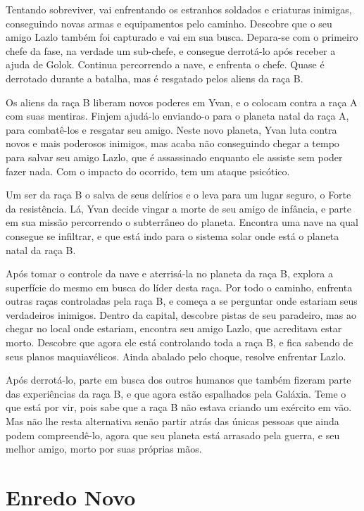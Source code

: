 \documentclass[12pt, a4paper]{article}
\begin{document}
    Tentando sobreviver, vai enfrentando os estranhos soldados e criaturas inimigas,
    conseguindo novas armas e equipamentos pelo caminho. Descobre que o seu amigo 
    Lazlo também foi capturado e vai em sua busca. Depara-se com o primeiro chefe
    da fase, na verdade um sub-chefe, e consegue derrotá-lo após receber a ajuda
    de Golok. Continua percorrendo a nave, e enfrenta o chefe. Quase é derrotado
    durante a batalha, mas é resgatado pelos aliens da raça B.

    Os aliens da raça B liberam novos poderes em Yvan, e o colocam contra a raça A
    com suas mentiras. Finjem ajudá-lo enviando-o para o planeta natal da raça A,
    para combatê-los e resgatar seu amigo. Neste novo planeta, Yvan luta contra
    novos e mais poderosos inimigos, mas acaba não conseguindo chegar a tempo para
    salvar seu amigo Lazlo, que é assassinado enquanto ele assiste sem poder fazer
    nada. Com o impacto do ocorrido, tem um ataque psicótico.

    Um ser da raça B o salva de seus delírios e o leva para um lugar seguro, o Forte
    da resistência. Lá, Yvan decide vingar a morte de seu amigo de infância, e
    parte em sua missão percorrendo o subterrâneo do planeta. Encontra uma nave na
    qual consegue se infiltrar, e que está indo para o sistema solar onde está
    o planeta natal da raça B.

    Após tomar o controle da nave e aterrisá-la no planeta da raça B, explora
    a superfície do mesmo em busca do líder desta raça. Por todo o caminho, enfrenta
    outras raças controladas pela raça B, e começa a se perguntar onde estariam seus
    verdadeiros inimigos. Dentro da capital, descobre pistas de seu paradeiro, mas
    ao chegar no local onde estariam, encontra seu amigo Lazlo, que acreditava estar
    morto. Descobre que agora ele está controlando toda a raça B, e fica sabendo de
    seus planos maquiavélicos. Ainda abalado pelo choque, resolve enfrentar Lazlo.

    Após derrotá-lo, parte em busca dos outros humanos que também fizeram parte
    das experiências da raça B, e que agora estão espalhados pela Galáxia.
    Teme o que está por vir, pois sabe que a raça B não estava criando um exército
    em vão. Mas não lhe resta alternativa senão partir atrás das únicas pessoas que ainda
    podem compreendê-lo, agora que seu planeta está arrasado pela
    guerra, e seu melhor amigo, morto por suas próprias mãos.

\section{Enredo Novo}
\end{document}
